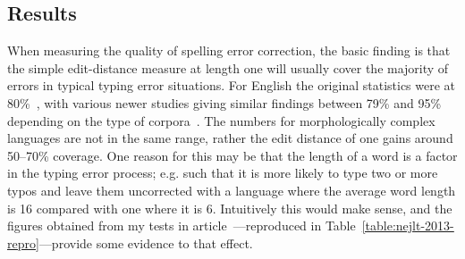 \documentclass[officiallayout,final]{unihelcompling}
\begin{document}
\subsection{Results}

When measuring the quality of spelling error correction, the basic finding is
that the simple edit-distance measure at length one will usually cover the
majority of errors in typical typing error situations. For English the original
statistics were at 80\%~\citep{damerau1964technique}, with various newer
studies giving similar findings between 79\% and 95\% depending on the type
of corpora~\citep{kukich1992spelling}.  The numbers for morphologically complex
languages are not in the same range, rather the edit distance of one gains around
50--70\% coverage. One reason for this may be that the length of a word is a
factor in the typing error process; e.g. such that it is more likely to type
two or more typos and leave them uncorrected with a language where the average
word length is 16 compared with one where it is 6. Intuitively this would make
sense, and the figures obtained from my tests in article~---reproduced in Table~\ref{table:nejlt-2013-repro}---provide some
evidence to that effect.
\end{document}
